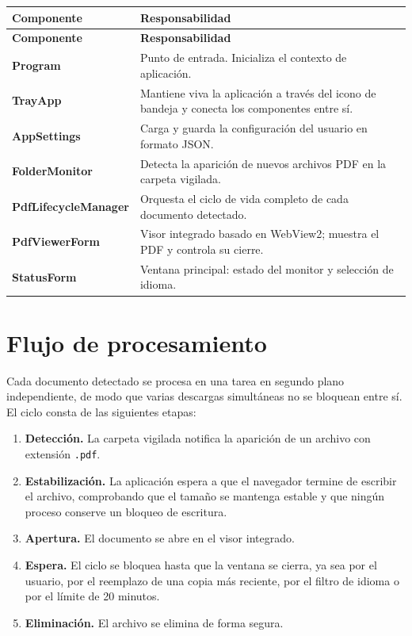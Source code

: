 \documentclass[11pt,a4paper]{article}
\begin{document}
\begin{xltabular}{\textwidth}{@{} >{\bfseries}p{5.1cm} L @{}}
\toprule
\normalfont\textbf{Componente} & \textbf{Responsabilidad} \\
\midrule
\endfirsthead
\toprule
\normalfont\textbf{Componente} & \textbf{Responsabilidad} \\
\midrule
\endhead
\bottomrule
\endfoot
Program & Punto de entrada. Inicializa el contexto de aplicación. \\
TrayApp & Mantiene viva la aplicación a través del icono de bandeja y conecta los componentes entre sí. \\
AppSettings & Carga y guarda la configuración del usuario en formato JSON. \\
FolderMonitor & Detecta la aparición de nuevos archivos PDF en la carpeta vigilada. \\
PdfLifecycleManager & Orquesta el ciclo de vida completo de cada documento detectado. \\
PdfViewerForm & Visor integrado basado en WebView2; muestra el PDF y controla su cierre. \\
StatusForm & Ventana principal: estado del monitor y selección de idioma. \\
\bottomrule
\end{xltabular}

\section{Flujo de procesamiento}
Cada documento detectado se procesa en una tarea en segundo plano independiente,
de modo que varias descargas simultáneas no se bloquean entre sí. El ciclo consta
de las siguientes etapas:

\begin{enumerate}[leftmargin=1.6em,itemsep=3pt]
  \item \textbf{Detección.} La carpeta vigilada notifica la aparición de un
        archivo con extensión \texttt{.pdf}.
  \item \textbf{Estabilización.} La aplicación espera a que el navegador termine
        de escribir el archivo, comprobando que el tamaño se mantenga estable y
        que ningún proceso conserve un bloqueo de escritura.
  \item \textbf{Apertura.} El documento se abre en el visor integrado.
  \item \textbf{Espera.} El ciclo se bloquea hasta que la ventana se cierra, ya
        sea por el usuario, por el reemplazo de una copia más reciente, por el
        filtro de idioma o por el límite de 20 minutos.
  \item \textbf{Eliminación.} El archivo se elimina de forma segura.
\end{enumerate}
\end{document}

